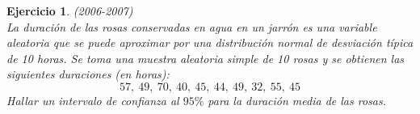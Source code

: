 \documentclass[12pt, a4paper]{amsart}
\newtheorem{ejer}{Ejercicio}
\begin{document}
\begin{ejer}\em (2006-2007)\\
La duración de las rosas conservadas en agua en un jarrón es una variable aleatoria que se puede aproximar por una distribución normal de desviación típica de 10 horas. Se toma una muestra aleatoria simple de 10 rosas y se obtienen las siguientes duraciones (en horas):
\[57,\ 49,\ 70,\ 40,\ 45,\ 44,\ 49,\ 32,\ 55,\ 45\]
Hallar un intervalo de confianza al $95\%$ para la duración media de las rosas.
\end{ejer}
\end{document}
